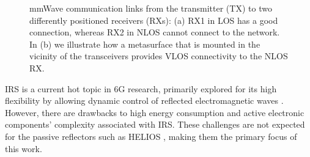 \begin{figure}[H]
	\centering
	\hfill
	\caption[mmWave communication links from the transmitter (TX) to two differently positioned receivers (RXs): (a) RX1 in \ac{LOS} has a good connection, whereas RX2 in \ac{NLOS} cannot connect to the network. In (b) we illustrate how a metasurface that is mounted in the vicinity of the transceivers provides \ac{VLOS} connectivity to the \ac{NLOS} RX.]{mmWave communication links from the transmitter (TX) to two differently positioned receivers (RXs): (a) RX1 in \ac{LOS} has a good connection, whereas RX2 in \ac{NLOS} cannot connect to the network. In (b) we illustrate how a metasurface that is mounted in the vicinity of the transceivers provides \ac{VLOS} connectivity to the \ac{NLOS} RX.}
	\label{fig:Tx_RX}
\end{figure}
\ac{IRS} is a current hot topic in 6G research, primarily explored for its high flexibility by allowing dynamic control of reflected electromagnetic waves \cite{IRSdesignandapp, Shen2020ModelingAA, wu2019towards}. However, there are drawbacks to high energy consumption and active electronic components' complexity associated with \ac{IRS}. These challenges are not expected for the passive reflectors such as \ac{HELIOS} \cite{Helios}, making them the primary focus of this work.

